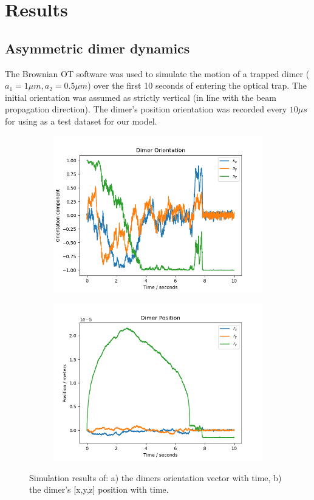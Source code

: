 \documentclass[preprint,3p]{elsarticle}
\begin{document}
\section{Results}
\label{3}
\subsection{Asymmetric dimer dynamics}
\label{3.1}
The Brownian OT software was used to simulate the motion of a trapped dimer ($a_1=1\mu m, a_2=0.5\mu m$) over the first 10 seconds of entering the optical trap. The initial orientation was assumed as strictly vertical (in line with the beam propagation direction). The dimer's position orientation was recorded every $10 \mu s$ for using as a test dataset for our model. 

\begin{figure}[t]
	\centering
	\begin{subfigure}{0.45\textwidth}
		\subcaption{}
		\includegraphics[width =\textwidth]{./Images/traj.png}
	\end{subfigure}
	\begin{subfigure}{0.45\textwidth}
		\subcaption{}
		\includegraphics[width=\textwidth]{./Images/pos.png}
	\end{subfigure}
	\caption{Simulation results of: a) the dimers orientation vector with time, b) the dimer's [x,y,z] position with time.}
\end{figure}
\end{document}
